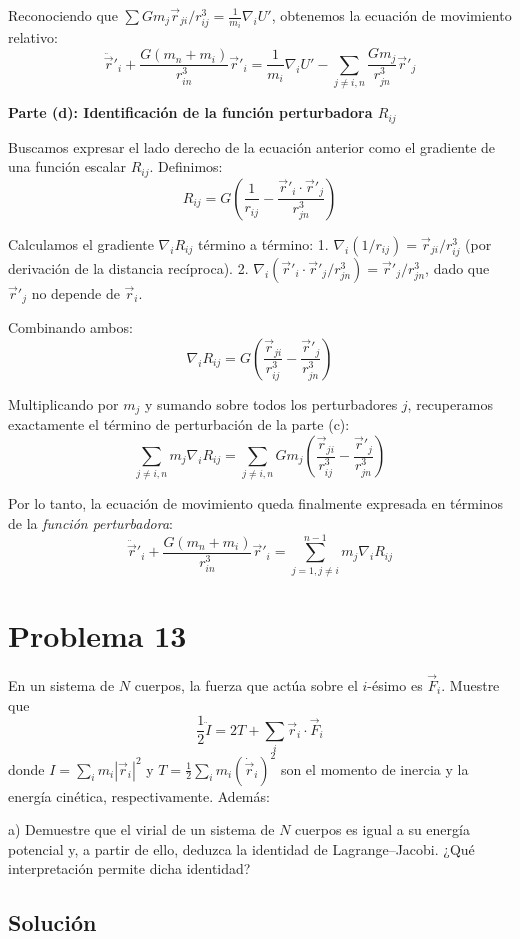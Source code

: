\documentclass[12pt, letterpaper]{article}
\begin{document}
Reconociendo que $\sum G m_j \vec{r}_{ji}/r_{ij}^3 = \frac{1}{m_i} \nabla_i U'$, obtenemos la ecuación de movimiento relativo:
$$ \ddot{\vec{r}}'_i + \frac{G(m_n + m_i)}{r_{in}^3} \vec{r}'_i = \frac{1}{m_i} \nabla_i U' - \sum_{j \neq i, n} \frac{G m_j}{r_{jn}^3} \vec{r}'_j $$

\textbf{Parte (d): Identificación de la función perturbadora $R_{ij}$}

Buscamos expresar el lado derecho de la ecuación anterior como el gradiente de una función escalar $R_{ij}$. Definimos:
$$ R_{ij} = G \left( \frac{1}{r_{ij}} - \frac{\vec{r}'_i \cdot \vec{r}'_j}{r_{jn}^3} \right) $$

Calculamos el gradiente $\nabla_i R_{ij}$ término a término:
1. $\nabla_i (1/r_{ij}) = \vec{r}_{ji} / r_{ij}^3$ (por derivación de la distancia recíproca).
2. $\nabla_i (\vec{r}'_i \cdot \vec{r}'_j / r_{jn}^3) = \vec{r}'_j / r_{jn}^3$, dado que $\vec{r}'_j$ no depende de $\vec{r}_i$.

Combinando ambos:
$$ \nabla_i R_{ij} = G \left( \frac{\vec{r}_{ji}}{r_{ij}^3} - \frac{\vec{r}'_j}{r_{jn}^3} \right) $$

Multiplicando por $m_j$ y sumando sobre todos los perturbadores $j$, recuperamos exactamente el término de perturbación de la parte (c):
$$ \sum_{j \neq i, n} m_j \nabla_i R_{ij} = \sum_{j \neq i, n} G m_j \left( \frac{\vec{r}_{ji}}{r_{ij}^3} - \frac{\vec{r}'_j}{r_{jn}^3} \right) $$

Por lo tanto, la ecuación de movimiento queda finalmente expresada en términos de la \textit{función perturbadora}:
$$ \ddot{\vec{r}}'_i + \frac{G(m_n + m_i)}{r_{in}^3} \vec{r}'_i = \sum_{j=1, j \neq i}^{n-1} m_j \nabla_i R_{ij} $$


\section{Problema 13}

En un sistema de $N$ cuerpos, la fuerza que actúa sobre el $i$-ésimo es $\vec{F}_i$. Muestre que 
$$ \frac{1}{2} \ddot{I} = 2T + \sum_i \vec{r}_i \cdot \vec{F}_i $$
donde $I = \sum_i m_i |\vec{r}_i|^2$ y $T = \frac{1}{2} \sum_i m_i (\dot{\vec{r}}_i)^2$ son el momento de inercia y la energía cinética, respectivamente. Además:

a) Demuestre que el virial de un sistema de $N$ cuerpos es igual a su energía potencial y, a partir de ello, deduzca la identidad de Lagrange–Jacobi. ¿Qué interpretación permite dicha identidad?

\subsection{Solución}
\end{document}
